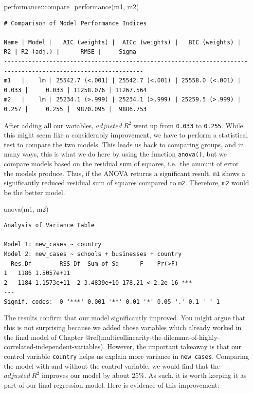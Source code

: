 \documentclass[
  letterpaper,
]{krantz}
\makeatletter
\newenvironment{Shaded}{\begin{snugshade}}{\end{snugshade}}
\newcommand{\FunctionTok}[1]{\textcolor[rgb]{0.28,0.35,0.67}{#1}}
\newcommand{\NormalTok}[1]{\textcolor[rgb]{0.00,0.23,0.31}{#1}}
\newcommand{\SpecialCharTok}[1]{\textcolor[rgb]{0.37,0.37,0.37}{#1}}
\newenvironment{kframe}{%
\medskip{}
\setlength{\fboxsep}{.8em}
 \def\at@end@of@kframe{}%
 \ifinner\ifhmode%
  \def\at@end@of@kframe{\end{minipage}}%
  \begin{minipage}{\columnwidth}%
 \fi\fi%
 \def\FrameCommand##1{\hskip\@totalleftmargin \hskip-\fboxsep
 \colorbox{shadecolor}{##1}\hskip-\fboxsep
     \hskip-\linewidth \hskip-\@totalleftmargin \hskip\columnwidth}%
 \MakeFramed {\advance\hsize-\width
   \@totalleftmargin\z@ \linewidth\hsize
   \@setminipage}}%
 {\par\unskip\endMakeFramed%
 \at@end@of@kframe}
\renewenvironment{Shaded}{\begin{kframe}}{\end{kframe}}
\makeatother
\begin{document}
\begin{Shaded}
\begin{Highlighting}[]
\NormalTok{performance}\SpecialCharTok{::}\FunctionTok{compare\_performance}\NormalTok{(m1, m2)}
\end{Highlighting}
\end{Shaded}

\begin{verbatim}
# Comparison of Model Performance Indices

Name | Model |   AIC (weights) |  AICc (weights) |   BIC (weights) |    R2 | R2 (adj.) |      RMSE |     Sigma
--------------------------------------------------------------------------------------------------------------
m1   |    lm | 25542.7 (<.001) | 25542.7 (<.001) | 25558.0 (<.001) | 0.033 |     0.033 | 11258.076 | 11267.564
m2   |    lm | 25234.1 (>.999) | 25234.1 (>.999) | 25259.5 (>.999) | 0.257 |     0.255 |  9870.095 |  9886.753
\end{verbatim}

After adding all our variables, \(adjusted\ R^2\) went up from
\texttt{0.033} to \texttt{0.255}. While this might seem like a
considerably improvement, we have to perform a statistical test to
compare the two models. This leads us back to comparing groups, and in
many ways, this is what we do here by using the function
\texttt{anova()}, but we compare models based on the residual sum of
squares, i.e.~the amount of error the models produce. Thus, if the ANOVA
returns a significant result, \texttt{m1} shows a significantly reduced
residual sum of squares compared to \texttt{m2}. Therefore, \texttt{m2}
would be the better model.

\begin{Shaded}
\begin{Highlighting}[]
\FunctionTok{anova}\NormalTok{(m1, m2)}
\end{Highlighting}
\end{Shaded}

\begin{verbatim}
Analysis of Variance Table

Model 1: new_cases ~ country
Model 2: new_cases ~ schools + businesses + country
  Res.Df        RSS Df  Sum of Sq      F    Pr(>F)    
1   1186 1.5057e+11                                   
2   1184 1.1573e+11  2 3.4839e+10 178.21 < 2.2e-16 ***
---
Signif. codes:  0 '***' 0.001 '**' 0.01 '*' 0.05 '.' 0.1 ' ' 1
\end{verbatim}

The results confirm that our model significantly improved. You might
argue that this is not surprising because we added those variables which
already worked in the final model of Chapter
@ref(multicollinearity-the-dilemma-of-highly-correlated-independent-variables).
However, the important takeaway is that our control variable
\texttt{country} helps us explain more variance in \texttt{new\_cases}.
Comparing the model with and without the control variable, we would find
that the \(adjusted\ R^2\) improves our model by about 25\%. As such, it
is worth keeping it as part of our final regression model. Here is
evidence of this improvement:
\end{document}
